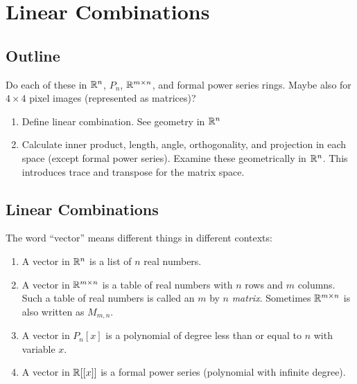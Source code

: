 \chapter{Linear Combinations}

\section{Outline}
  Do each of these in $\mathbb{R}^n$, $P_n$, $\mathbb{R}^{m\times n}$, and formal
  power series rings.  Maybe also for $4\times 4$ pixel images
  (represented as matrices)?
  \begin{enumerate}
  \item Define linear combination.  See geometry in $\mathbb{R}^n$
  \item Calculate inner product, length, angle, orthogonality, and
    projection in each space (except formal power series).  Examine
    these geometrically in $\mathbb{R}^n$.  This introduces trace and
    transpose for the matrix space.
  \end{enumerate}

\section{Linear Combinations}

\begin{definition}
  The word ``vector'' means different things in different contexts:
  \begin{enumerate}
  \item A vector in $\mathbb{R}^n$ is a list of $n$ real numbers.
  \item A vector in $\mathbb{R}^{m\times n}$ is a table of real numbers with
    $n$ rows and $m$ columns.  Such a table of real numbers is called
    an $m$ by $n$ \emph{matrix}.  Sometimes $\mathbb{R}^{m\times n}$ is also
    written as $M_{m,n}$.
  \item A vector in $P_n[x]$ is a polynomial of degree less than or equal
    to $n$ with variable $x$.
  \item A vector in $\mathbb{R}[[x]]$ is a formal power series (polynomial with
    infinite degree).
  \end{enumerate}
\end{definition}

